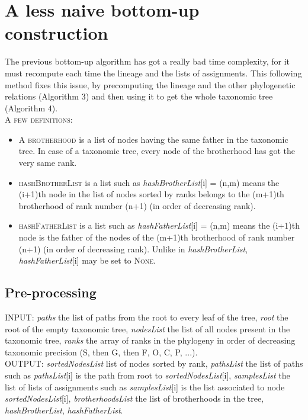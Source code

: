 \documentclass{report}
\begin{document}
\section{A less naive bottom-up construction}

The previous bottom-up algorithm has got a really bad time complexity, for it must recompute each time the lineage and the lists of assignments. This following method fixes this issue, by precomputing the lineage and the other phylogenetic relations (Algorithm 3) and then using it to get the whole taxonomic tree (Algorithm 4). \\

\textsc{A few definitions:}
\begin{itemize}
\item A \textsc{brotherhood} is a list of nodes having the same father in the taxonomic tree. In case of a taxonomic tree, every node of the brotherhood has got the very same rank.
\item \textsc{hashBrotherList} is a list such as \emph{hashBrotherList}[i] = (n,m) means the (i+1)th node in the list of nodes sorted by ranks belongs to the (m+1)th brotherhood of rank number (n+1) (in order of decreasing rank).
\item \textsc{hashFatherList} is a list such as \emph{hashFatherList}[i] = (n,m) means the (i+1)th node is the father of the nodes of the (m+1)th brotherhood of rank number (n+1) (in order of decreasing rank). Unlike in \emph{hashBrotherList}, \emph{hashFatherList}[i] may be set to \textsc{None}. 
\end{itemize}

\subsection{Pre-processing}

\textsc{INPUT:} \emph{paths} the list of paths from the root to every leaf of the tree, \emph{root} the root of the empty taxonomic tree, \emph{nodesList} the list of all nodes present in the taxonomic tree, \emph{ranks} the array of ranks in the phylogeny in order of decreasing taxonomic precision (S, then G, then F, O, C, P, ...).\\

\textsc{OUTPUT:} \emph{sortedNodesList} list of nodes sorted by rank, \emph{pathsList} the list of paths such as \emph{pathsList}[i] is the path from root to \emph{sortedNodesList}[i], \emph{samplesList} the list of lists of assignments such as \emph{samplesList}[i] is the list associated to node \emph{sortedNodesList}[i], \emph{brotherhoodsList} the list of brotherhoods in the tree, \emph{hashBrotherList}, \emph{hashFatherList}.\\
\end{document}
